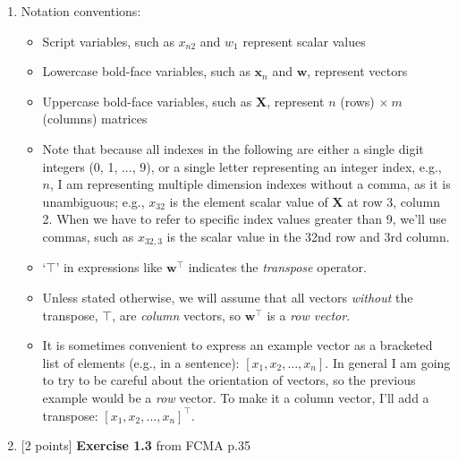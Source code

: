 \documentclass[10pt]{article}
\begin{document}
\begin{enumerate}
{\bf Solution.} 

I added a red line to the image above to indicate the kind of slope I would expect. Y intercept would be around 11.25, slope is ?.

\newpage
NOTE: The following three exercises (3, 4 and 5) review basic linear algebra concepts.

\item[] Notation conventions:
\begin{itemize}
\item Script variables, such as $x_{n2}$ and $w_1$ represent scalar values
\item Lowercase bold-face variables, such as $\mathbf{x}_n$ and $\mathbf{w}$, represent vectors
\item Uppercase bold-face variables, such as $\mathbf{X}$, represent $n$ (rows) $\times ~m$ (columns) matrices
\item Note that because all indexes in the following are either a single digit integers (0, 1, ..., 9), or a single letter representing an integer index, e.g., $n$, I am representing multiple dimension indexes without a comma, as it is unambiguous; e.g., $x_{32}$ is the element scalar value of $\mathbf{X}$ at row 3, column 2.  When we have to refer to specific index values greater than 9, we'll use commas, such as $x_{32,3}$ is the scalar value in the 32nd row and 3rd column.
\item `$\top$' in expressions like $\mathbf{w}^\top$ indicates the {\em transpose} operator.
\item Unless stated otherwise, we will assume that all vectors {\em without} the transpose, $\top$, are {\em column} vectors, so $\mathbf{w}^\top$ is a {\em row vector}.
\item It is sometimes convenient to express an example vector as a bracketed list of elements (e.g., in a sentence): $[x_1, x_2, ..., x_n]$.  In general I am going to try to be careful about the orientation of vectors, so the previous example would be a {\em row} vector.  To make it a column vector, I'll add a transpose: $[x_1, x_2, ..., x_n]^\top$.
\end{itemize}



\item \label{prob:3} [2 points]
{\bf Exercise 1.3} from FCMA p.35


\end{enumerate}
\end{document}

